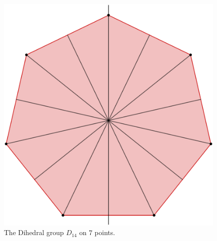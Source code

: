 \begin{figure}
    \centering
    \includegraphics[scale = 0.2]{Figures/Chapter1/D_14.eps}
    \caption{The Dihedral group $D_{14}$ on $7$ points.}
    \label{fig_1.1}
\end{figure}
